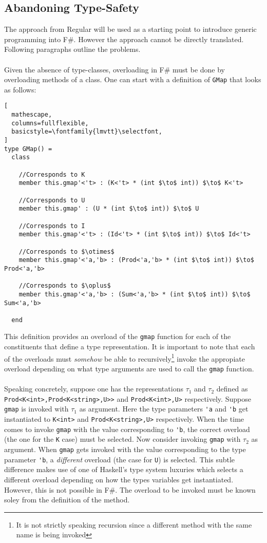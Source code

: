 \documentclass[8pt]{extarticle}
\begin{document}
\subsection{Abandoning Type-Safety}
The approach from Regular will be used as a starting point to introduce generic programming into F\#. However the approach cannot be directly translated. Following paragraphs outline the problems.
\\\\Given the absence of type-classes, overloading in F\# must be done by overloading methods of a class. One can start with a definition of \verb+GMap+ that looks as follows:
\begin{lstlisting}[
  mathescape,
  columns=fullflexible,
  basicstyle=\fontfamily{lmvtt}\selectfont,
]
type GMap() =
  class

    //Corresponds to K
    member this.gmap'<'t> : (K<'t> * (int $\to$ int)) $\to$ K<'t>
    
    //Corresponds to U
    member this.gmap' : (U * (int $\to$ int)) $\to$ U

    //Corresponds to I
    member this.gmap'<'t> : (Id<'t> * (int $\to$ int)) $\to$ Id<'t>

    //Corresponds to $\otimes$
    member this.gmap'<'a,'b> : (Prod<'a,'b> * (int $\to$ int)) $\to$ Prod<'a,'b>

    //Corresponds to $\oplus$
    member this.gmap'<'a,'b> : (Sum<'a,'b> * (int $\to$ int)) $\to$ Sum<'a,'b>

  end
\end{lstlisting}
This definition provides an overload of the \verb+gmap+ function for each of the constituents that define a type representation. It is important to note that each of the overloads must {\it somehow} be able to recursively\footnote{It is not strictly speaking recursion since a different method with the same name is being invoked} invoke the appropiate overload depending on what type arguments are used to call the \verb+gmap+ function.
\\\\Speaking concretely, suppose one has the representations $\tau_1$ and $\tau_2$ defined as \verb+Prod<K<int>,Prod<K<string>,U>>+ and \verb+Prod<K<int>,U>+ respectively. Suppose \verb+gmap+ is invoked with $\tau_1$ as argument. Here the type parameters \verb+'a+ and \verb+'b+ get instantiated to \verb+K<int>+ and \verb+Prod<K<string>,U>+ respectively. When the time comes to invoke \verb+gmap+ with the value corresponding to \verb+'b+, the correct overload (the one for the \verb+K+ case) must be selected. Now consider invoking \verb+gmap+ with $\tau_2$ as argument. When \verb+gmap+ gets invoked with the value corresponding to the type parameter \verb+'b+, a {\it different} overload (the case for \verb+U+) is selected. This subtle difference makes use of one of Haskell's type system luxuries which selects a different overload depending on how the types variables get instantiated. However, this is not possible in F\#. The overload to be invoked must be known soley from the definition of the method.
\end{document}
